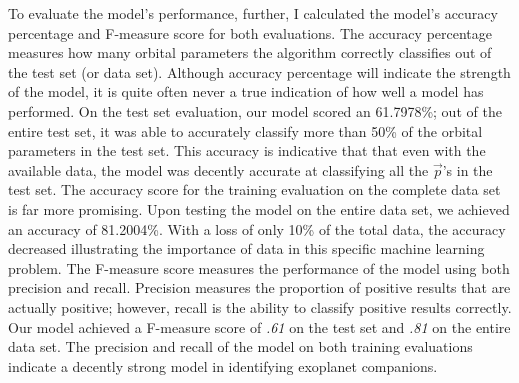 \documentclass[12pt]{article}
\begin{document}
To evaluate the model's performance, further, I calculated the model's accuracy percentage and F-measure score for both evaluations. The accuracy percentage measures how many orbital parameters the algorithm correctly classifies out of the test set (or data set). Although accuracy percentage will indicate the strength of the model, it is quite often never a true indication of how well a model has performed. On the test set evaluation, our model scored an 61.7978\%; out of the entire test set, it was able to accurately classify more than 50\% of the orbital parameters in the test set. This accuracy is indicative that that even with the available data, the model was decently accurate at classifying all the $\vec{p}$'s in the test set. The accuracy score for the training evaluation on the complete data set is far more promising. Upon testing the model on the entire data set, we achieved an accuracy of 81.2004\%. With a loss of only 10\% of the total data, the accuracy decreased illustrating the importance of data in this specific machine learning problem. The F-measure score measures the performance of the model using both precision and recall. Precision measures the proportion of positive results that are actually positive; however, recall is the ability to classify positive results correctly. Our model achieved a F-measure score of \emph{.61} on the test set and \emph{.81} on the entire data set. The precision and recall of the model on both training evaluations indicate a decently strong model in identifying exoplanet companions. 
\end{document}
